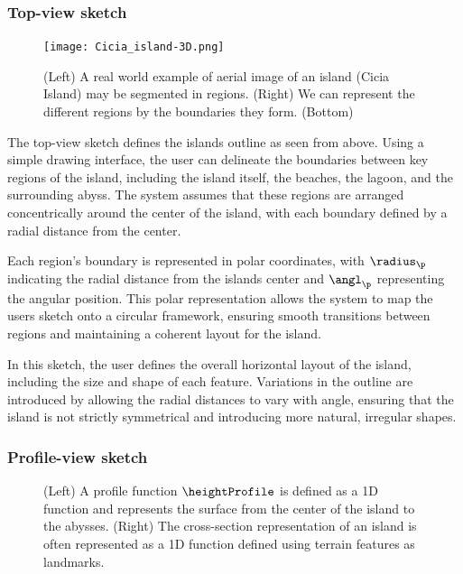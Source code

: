 \subsubsection{Top-view sketch}

\begin{figure}[H]
	\centering
	\texttt{[image: Cicia\_island-3D.png]}
    \caption{(Left) A real world example of aerial image of an island (Cicia Island) may be segmented in regions. (Right) We can represent the different regions by the boundaries they form. (Bottom)  }
    \label{fig:coral-island-top-view-sketch}
\end{figure}

The top-view sketch defines the islands outline as seen from above. Using a simple drawing interface, the user can delineate the boundaries between key regions of the island, including the island itself, the beaches, the lagoon, and the surrounding abyss. The system assumes that these regions are arranged concentrically around the center of the island, with each boundary defined by a radial distance from the center.

Each region's boundary is represented in polar coordinates, with $\radius_\p$ indicating the radial distance from the islands center and $\angl_\p$ representing the angular position. This polar representation allows the system to map the users sketch onto a circular framework, ensuring smooth transitions between regions and maintaining a coherent layout for the island.

In this sketch, the user defines the overall horizontal layout of the island, including the size and shape of each feature. Variations in the outline are introduced by allowing the radial distances to vary with angle, ensuring that the island is not strictly symmetrical and introducing more natural, irregular shapes.

\subsubsection{Profile-view sketch}

\begin{figure}[H]
	\centering
    \caption{(Left) A profile function $\heightProfile$ is defined as a 1D function and represents the surface from the center of the island to the abysses. (Right) The cross-section representation of an island is often represented as a 1D function defined using terrain features as landmarks. }
    \label{fig:coral-island-profile-function}
\end{figure}

